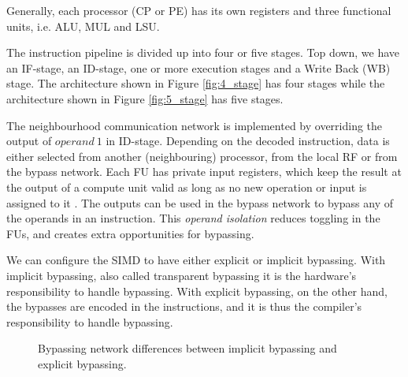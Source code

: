 Generally, each processor (CP or PE) has its own registers and three functional units, i.e. ALU, MUL and LSU. 

The instruction pipeline is divided up into four or five stages. Top down, we have an IF-stage, an ID-stage, one or more execution stages and a Write Back (WB) stage. The architecture shown in Figure \ref{fig:4_stage} has four stages while the architecture shown in Figure \ref{fig:5_stage} has five stages.

The neighbourhood communication network is implemented by overriding the output of $operand\ 1$ in ID-stage. Depending on the decoded instruction, data is either selected from another (neighbouring) processor, from the local RF or from the bypass network. Each FU has private input registers, which keep the result at the output of a compute unit valid as long as no new operation or input is assigned to it \cite{dongrio1}. The outputs can be used in the bypass network to bypass any of the operands in an instruction. This \emph{operand isolation} reduces toggling in the FUs, and creates extra opportunities for bypassing.

We can configure the SIMD to have either explicit or implicit bypassing. With implicit bypassing, also called transparent bypassing it is the hardware's responsibility to handle bypassing. With explicit bypassing, on the other hand, the bypasses are encoded in the instructions, and it is thus the compiler's responsibility to handle bypassing.

\begin{figure}[t]
\centering
{}
\hfil
{}
\caption{Bypassing network differences between implicit bypassing and explicit bypassing.}
\label{fig:datapath_approaches}
\end{figure}

